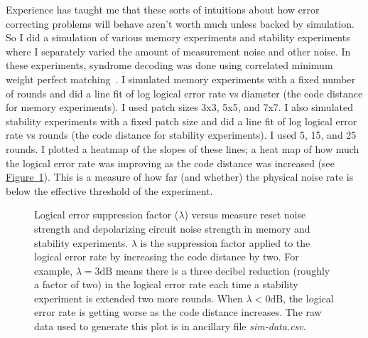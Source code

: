 \documentclass[onecolumn,unpublished,a4paper]{quantumarticle}
\theoremstyle{definition}
\theoremstyle{definition}
\theoremstyle{definition}
\newcommand{\fig}[1]{\hyperref[fig:#1]{Figure~\ref*{fig:#1}}}
\begin{document}
Experience has taught me that these sorts of intuitions about how error correcting problems will behave aren't worth much unless backed by simulation.
So I did a simulation of various memory experiments and stability experiments where I separately varied the amount of measurement noise and other noise.
In these experiments, syndrome decoding was done using correlated minimum weight perfect matching~\cite{fowler2013optimal}.
I simulated memory experiments with a fixed number of rounds and did a line fit of log logical error rate vs diameter (the code distance for memory experiments).
I used patch sizes 3x3, 5x5, and 7x7.
I also simulated stability experiments with a fixed patch size and did a line fit of log logical error rate vs rounds (the code distance for stability experiments).
I used 5, 15, and 25 rounds.
I plotted a heatmap of the slopes of these lines; a heat map of how much the logical error rate was improving as the code distance was increased (see \fig{stability_sim_mr}).
This is a measure of how far (and whether) the physical noise rate is below the effective threshold of the experiment.

\begin{figure}
    \centering
    \caption{
        Logical error suppression factor ($\lambda$) versus measure reset noise strength and depolarizing circuit noise strength in memory and stability experiments.
        $\lambda$ is the suppression factor applied to the logical error rate by increasing the code distance by two.
        For example, $\lambda=3\text{dB}$ means there is a three decibel reduction (roughly a factor of two) in the logical error rate each time a stability experiment is extended two more rounds.
        When $\lambda < 0\text{dB}$, the logical error rate is getting worse as the code distance increases.
        The raw data used to generate this plot is in ancillary file \emph{sim-data.csv}.
    }
    \label{fig:stability_sim_mr}
\end{figure}
\end{document}
